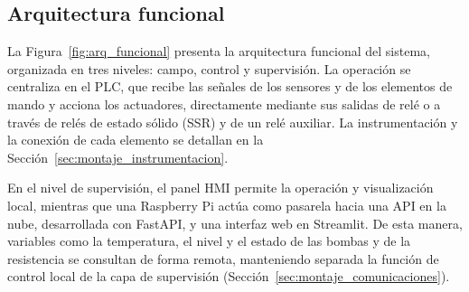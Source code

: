 \subsection{Arquitectura funcional}
La Figura~\ref{fig:arq_funcional} presenta la arquitectura funcional del sistema, organizada en tres niveles: campo, control y supervisión. La operación se centraliza en el PLC, que recibe las señales de los sensores y de los elementos de mando y acciona los actuadores, directamente mediante sus salidas de relé o a través de relés de estado sólido (SSR) y de un relé auxiliar. La instrumentación y la conexión de cada elemento se detallan en la Sección~\ref{sec:montaje_instrumentacion}.

En el nivel de supervisión, el panel HMI permite la operación y visualización local, mientras que una Raspberry Pi actúa como pasarela hacia una API en la nube, desarrollada con FastAPI, y una interfaz web en Streamlit. De esta manera, variables como la temperatura, el nivel y el estado de las bombas y de la resistencia se consultan de forma remota, manteniendo separada la función de control local de la capa de supervisión (Sección~\ref{sec:montaje_comunicaciones}).

